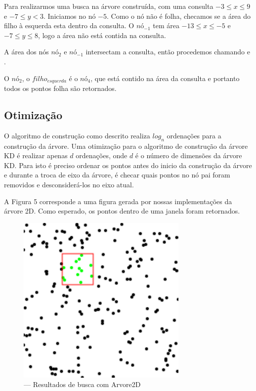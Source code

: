 Para realizarmos uma busca na árvore construída, com uma consulta $ -3 \leq x \leq 9 $ e $-7 \leq y < 3$.
Iniciamos no nó $-5$. Como o nó não é folha, checamos se a área do filho à esquerda esta dentro da consulta.
O $nó_{-1}$ tem área $ -13 \leq x \leq -5 $ e  $ -7 \leq y \leq 8$, logo a área não está contida 
na consulta.

A área dos nós $nó_2$ e $nó_{-1}$ intersectam a consulta, então procedemos chamando
 e .

O $nó_{2}$, o $filho_{esquerda}$ é o $nó_4$, que está contido na área da consulta e portanto todos
os pontos folha são retornados.

\subsection{Otimização}
O algoritmo de construção como descrito realiza $log_n$ ordenações para a construção da árvore.
Uma otimização para o algoritmo de construção da árvore KD é realizar apenas $d$ ordenações, onde $d$
é o número de dimensões da árvore KD.
Para isto é preciso ordenar os pontos antes do inicio da construção da árvore e durante a troca de eixo
da árvore, é checar quais pontos no nó pai foram removidos e desconsiderá-los no eixo atual.

A Figura 5 corresponde a uma figura gerada por nossas implementações da árvore 2D. Como esperado, os
pontos dentro de uma janela foram retornados.
\begin{figure}[H]
    \caption{\label{fig:Fig_5} — Resultados de busca com Arvore2D}
    \begin{center}
        \includegraphics{images/points.pdf}
    \end{center}
\end{figure}
\clearpage



